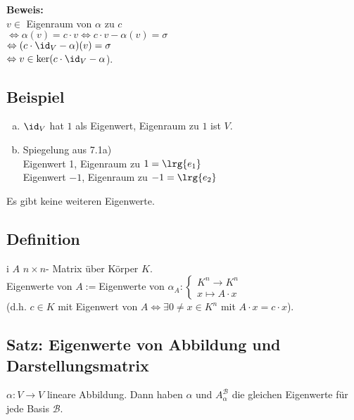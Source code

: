   \textbf{Beweis:}\\
  $v\in$ Eigenraum von $\alpha$ zu $c$\\
  $\Leftrightarrow\alpha(v)=c\cdot v\Leftrightarrow c\cdot
  v-\alpha(v)=\sigma$\\
  $\Leftrightarrow(c\cdot\id_V-\alpha)(v)=\sigma$\\
  $\Leftrightarrow v\in\mbox{ker}(c\cdot\id_V-\alpha$).

\subsection{Beispiel}
  \begin{enumerate}[a)]
    \item $\id_V$ hat $1$ als Eigenwert, Eigenraum zu $1$ ist $V$.
    \item Spiegelung aus 7.1a)\\
      Eigenwert 1, Eigenraum zu $1=\lrg{e_1}$\\
      Eigenwert $-1$, Eigenraum zu $-1=\lrg{e_2}$
  \end{enumerate}

  Es gibt keine weiteren Eigenwerte.

\subsection{Definition}
  i $A$ $n\times n$- Matrix über Körper $K$.\\
  Eigenwerte von $A:=$Eigenwerte von $\alpha_A:\begin{cases}K^n\rightarrow
  K^n\\ x\mapsto A\cdot x\end{cases}$\\
  (d.h. $c\in K$ mit Eigenwert von $A\Leftrightarrow\exists 0\neq x\in K^n$ mit
  $A\cdot x=c\cdot x$).

\subsection{Satz: Eigenwerte von Abbildung und Darstellungsmatrix}
  $\alpha: V\rightarrow V$ lineare Abbildung. Dann haben $\alpha$ und
  $A_\alpha^{\mathcal{B}}$ die gleichen Eigenwerte für jede Basis ${\mathcal{B}}$.

